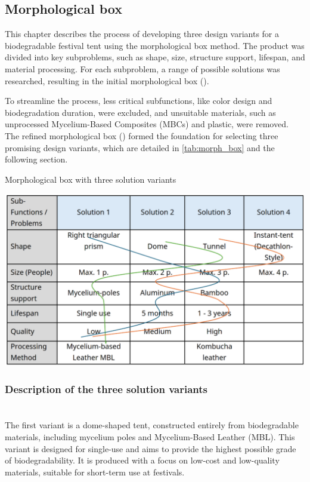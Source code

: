 \documentclass{article}
\newcommand{\pph}[1]{\paragraph{#1} \phantom{}\\}
\begin{document}
\subsection{Morphological box}
This chapter describes the process of developing three design variants for a biodegradable
festival tent using the morphological box method. The product was divided into key
subproblems, such as shape, size, structure support, lifespan, and material processing.
For each subproblem, a range of possible solutions was researched, resulting in the
initial morphological box ({\color{red}{see Appendix, Table xy}}).

To streamline the process, less critical subfunctions, like color design and biodegradation
duration, were excluded, and unsuitable materials, such as unprocessed Mycelium-Based
Composites (MBCs) and plastic, were removed. The refined morphological box
({\color{red}{see Appendix, Table xy}}) formed the foundation for selecting three
promising design variants, which are detailed in \autoref{tab:morph_box} and the following
section. 

\begin{table}[ht!]
    \centering
    \caption{Morphological box with three solution variants}
    \includegraphics[width=.7\textwidth]{media/morph_box.png}
    \label{tab:morph_box}
\end{table}

\subsubsection{Description of the three solution variants}
\pph{\color{newgreen}{Variant 1: Dome tent (Single use, Fully biodegradable)}}
The first variant is a dome-shaped tent, constructed entirely from biodegradable materials,
including mycelium poles and Mycelium-Based Leather (MBL). This variant is designed for
single-use and aims to provide the highest possible grade of biodegradability. It is
produced with a focus on low-cost and low-quality materials, suitable for short-term use
at festivals.
\end{document}

